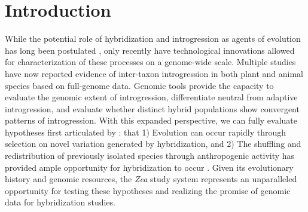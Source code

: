 
\begin{center}
\end{center}
%
%

\section*{Introduction}

While the potential role of hybridization and introgression as agents of evolution has long been postulated \citep{Anderson1948, Anderson1954, Stebbins1959}, only recently have technological innovations allowed for characterization of these processes on a genome-wide scale. 
Multiple studies have now reported evidence of inter-taxon introgression in both plant \citep{Hufford2013, renaut2013} and animal \citep{consortiumbutterfly2012, staubach2012, huerta2014} species based on full-genome data.
Genomic tools provide the capacity to evaluate the genomic extent of introgression, differentiate neutral from adaptive introgression, and evaluate whether distinct hybrid populations show convergent patterns of introgression.
With this expanded perspective, we can fully evaluate hypotheses first articulated by \citet{Anderson1954}: that 1) Evolution can occur rapidly through selection on novel variation generated by hybridization, and 2) The shuffling and redistribution of previously isolated species through anthropogenic activity has provided ample opportunity for hybridization to occur \citep{Anderson1954}.
Given its evolutionary history and genomic resources, the \emph{Zea} study system represents an unparalleled opportunity for testing these hypotheses and realizing the promise of genomic data for hybridization studies.

